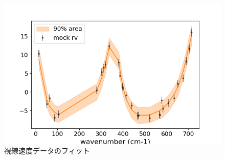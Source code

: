 \begin{figure}
    \centering
    \includegraphics[width=\linewidth]{fig/rv_fit.png}
    \caption{視線速度データのフィット}
    \label{fig:rvfit}
\end{figure}